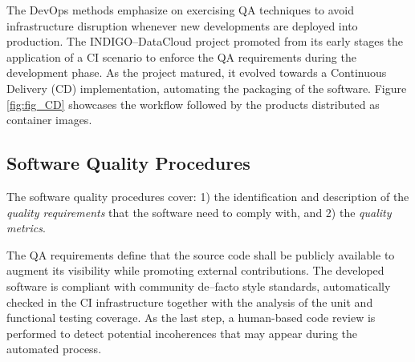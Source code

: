 \documentclass[journal]{IEEEtran}
\begin{document}
The DevOps methods emphasize on exercising QA techniques to avoid infrastructure disruption whenever new developments are deployed into production. The INDIGO--DataCloud project promoted from its early stages the application of a CI scenario to enforce the QA requirements during the development phase. As the project matured, it evolved towards a Continuous Delivery (CD) implementation, automating the packaging of the software. Figure \ref{fig:fig_CD} showcases the workflow followed by the products distributed as container images.

\subsection{Software Quality Procedures}

The software quality procedures \cite{indigo-d31} cover: 1) the identification and description of the \emph{quality requirements} that the software need to comply with, and 2) the \emph{quality metrics}.

The QA requirements define that the source code shall be publicly available to augment its visibility while promoting external contributions. The developed software is compliant with community de--facto style standards, automatically checked in the CI infrastructure together with the analysis of the unit and functional testing coverage. As the last step, a human-based code review is performed to detect potential incoherences that may appear during the automated process.
\end{document}
